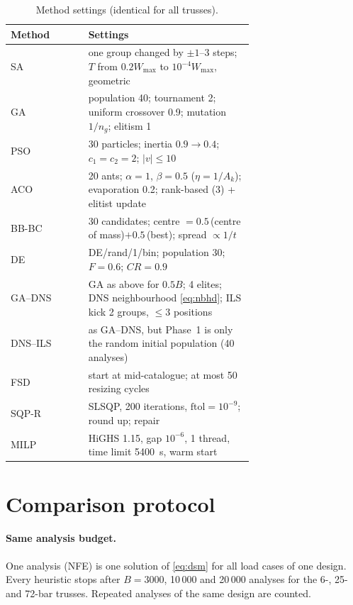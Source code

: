 \documentclass[lineno,pdflatex,sn-mathphys-num]{sn-jnl}
\begin{document}
\begin{table}[tbp]
\centering\footnotesize
\caption{Method settings (identical for all trusses).}
\label{tab:params}
\begin{tabular}{@{}lp{0.68\linewidth}@{}}
\toprule
Method & Settings\\
\midrule
SA & one group changed by $\pm1$--$3$ steps; $T$ from $0.2W_{\max}$ to $10^{-4}W_{\max}$, geometric\\
GA & population 40; tournament 2; uniform crossover 0.9; mutation $1/n_g$; elitism 1\\
PSO & 30 particles; inertia $0.9\to0.4$; $c_1=c_2=2$; $|v|\le10$\\
ACO & 20 ants; $\alpha=1$, $\beta=0.5$ ($\eta=1/A_k$); evaporation 0.2; rank-based (3) + elitist update\\
BB-BC & 30 candidates; centre $=0.5\,$(centre of mass)$+0.5\,$(best); spread $\propto1/t$\\
DE & DE/rand/1/bin; population 30; $F=0.6$; $CR=0.9$\\
GA--DNS & GA as above for $0.5B$; 4 elites; DNS neighbourhood \cref{eq:nbhd}; ILS kick 2 groups, $\le3$ positions\\
DNS--ILS & as GA--DNS, but Phase~1 is only the random initial population (40 analyses)\\
FSD & start at mid-catalogue; at most 50 resizing cycles\\
SQP-R & SLSQP, 200 iterations, $\text{ftol}=10^{-9}$; round up; repair\\
MILP & HiGHS 1.15, gap $10^{-6}$, 1 thread, time limit 5400~s, warm start\\
\bottomrule
\end{tabular}
\end{table}

\section{Comparison protocol}
\label{sec:protocol}

\paragraph{Same analysis budget.} One analysis (NFE) is one solution of
\cref{eq:dsm} for all load cases of one design. Every heuristic stops after
$B=3000$, 10\,000 and 20\,000 analyses for the 6-, 25- and 72-bar trusses.
Repeated analyses of the same design are counted.
\end{document}
